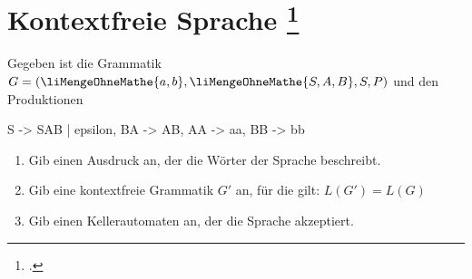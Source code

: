 \documentclass{lehramt-informatik-aufgabe}
\begin{document}
\let\m=\liMengeOhneMathe

\section{Kontextfreie Sprache
\footcite{theo:ab:2}}

Gegeben ist die Grammatik $G = (\m{a, b}, \m{S, A, B}, S, P)$ und den
Produktionen

\bigskip
\noindent
\begin{liProduktionsRegeln}
S -> SAB | epsilon,
BA -> AB,
AA -> aa,
BB -> bb
\end{liProduktionsRegeln}
\begin{enumerate}


\item Gib einen Ausdruck an, der die Wörter der Sprache beschreibt.


\item Gib eine kontextfreie Grammatik $G'$ an, für die gilt:
$L(G') = L(G)$


\item Gib einen Kellerautomaten an, der die Sprache akzeptiert.

\end{enumerate}
\end{document}
